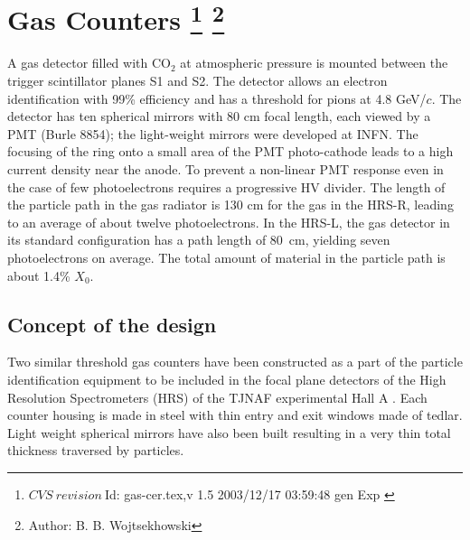 \chapter[Gas \Cherenkov{} Counters]{Gas \Cherenkov{} Counters
\footnote{
  $CVS~revision~ $Id: gas-cer.tex,v 1.5 2003/12/17 03:59:48 gen Exp $ $
}
\footnote{Author: B. B. Wojtsekhowski }
}

A gas \Cherenkov{} detector filled  with CO$_{2}$ at atmospheric 
pressure is mounted between the trigger scintillator planes S1 and S2. 
The detector allows an electron identification
with 99\% efficiency and has a threshold for pions at 4.8 GeV/$c$.
The detector has ten spherical mirrors with 80 cm focal length, each
viewed by a PMT (Burle 8854);
the light-weight mirrors were developed at INFN.
The focusing of the \Cherenkov{} ring onto a
small area of the PMT photo-cathode leads to a high current density  near
the anode. To prevent a non-linear PMT response even in the case of few
photoelectrons requires a progressive HV divider.
The length of the particle path in the gas radiator is 130 cm for the gas
\Cherenkov{} in the HRS-R, leading to an average of about twelve photoelectrons.
In the HRS-L, the gas \Cherenkov{} detector in its standard configuration has
a path length of 80~cm, yielding seven photoelectrons on average.
The total amount of material in the particle path is about 1.4\% $X_0$.

\section[Concept of the design]{Concept of the design}

Two similar threshold gas \Cherenkov{} counters have been constructed 
as a part of the particle identification equipment to be included 
in the focal plane detectors of the High Resolution Spectrometers (HRS) 
of the TJNAF experimental Hall A%
. 
Each counter housing is made in steel with thin entry and 
exit windows made of tedlar.
Light weight spherical mirrors have also been built resulting in 
a very thin total thickness traversed by particles. 
%

